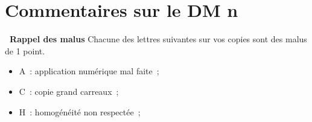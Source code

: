 \documentclass[a4paper, 10pt, final, garamond]{book}
\begin{document}
\setcounter{chapter}{4}

\chapter{Commentaires sur le DM n}

\begin{NCprop}[width=\linewidth]{\centering\bfseries\ Rappel des malus}
    Chacune des lettres suivantes sur vos copies sont des malus de \num{1}
    point.\smallbreak
    \begin{minipage}{0.50\linewidth}
        \begin{itemize}
            \item A~: application numérique mal faite~;
            \item C~: copie grand carreaux~;
        \end{itemize}
    \end{minipage}
    \begin{minipage}{0.50\linewidth}
        \begin{itemize}
            \item H~: homogénéité non respectée~;
        \end{itemize}
    \end{minipage}
\end{NCprop}
\end{document}
